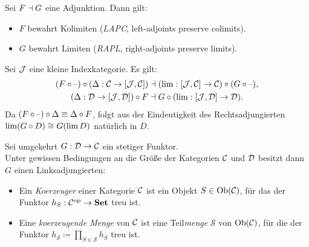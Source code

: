 \documentclass{cheat-sheet}
\begin{document}
\begin{lem}
  Sei $F \dashv G$ eine Adjunktion. Dann gilt:
  \begin{itemize}
    \item $F$ bewahrt Kolimiten (\emph{LAPC}, left-adjoints preserve colimits).
    \item $G$ bewahrt Limiten (\emph{RAPL}, right-adjoints preserve limits).
  \end{itemize}
\end{lem}

\begin{beweis}[RAPL]
  Sei $\mathcal{J}$ eine kleine Indexkategorie.
  Es gilt:
  \begin{align*}
    (F \circ \text{--}) \circ (\Delta : \mathcal{C} \to [\mathcal{J}, \mathcal{C}]) & \dashv (\lim : [\mathcal{J}, \mathcal{C}] \to \mathcal{C}) \circ (G \circ \text{--}), \\
    (\Delta : \mathcal{D} \to [\mathcal{J}, \mathcal{D}]) \circ F & \dashv G \circ (\lim : [\mathcal{J}, \mathcal{D}] \to \mathcal{D}).
  \end{align*}
  Da $(F \circ \text{--}) \circ \Delta \equiv \Delta \circ F$, folgt aus der Eindeutigkeit des Rechtsadjungierten
  $\lim (G \circ D) \cong G(\lim D)$ natürlich in $D$.
\end{beweis}

\begin{bem}
  Sei umgekehrt $G : \mathcal{D} \to \mathcal{C}$ ein stetiger Funktor. \\
  Unter gewissen Bedingungen an die Größe der Kategorien $\mathcal{C}$ und $\mathcal{D}$ besitzt dann $G$ einen Linksadjungierten:
\end{bem}

\begin{defn}
  \begin{itemize}
    \item Ein \emph{Koerzeuger} einer Kategorie $\mathcal{C}$ ist ein Objekt $S \in \operatorname{Ob}(\mathcal{C})$, für das der Funktor $h_S : \mathcal{C}^{\mathrm{op}} \to \mathbf{Set}$ treu ist.
    \item Eine \emph{koerzeugende Menge} von $\mathcal{C}$ ist eine Teil\textit{menge} $\mathcal{S}$ von $\operatorname{Ob}(\mathcal{C})$, für die der Funktor $h_{\mathcal{S}} \coloneqq \prod_{S \in \mathcal{S}} h_S$ treu ist.
  \end{itemize}
\end{defn}
\end{document}
